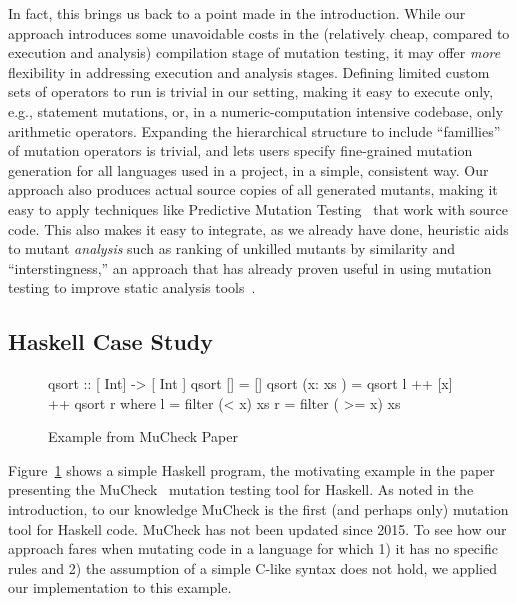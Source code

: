\documentclass[sigconf,review, anonymous]{acmart}
\begin{document}
{In fact, this brings us back to a point made in the introduction.
While our approach introduces some unavoidable costs in the
(relatively cheap, compared to execution and analysis) compilation stage of
mutation testing, it may offer \emph{more} flexibility in addressing
execution and analysis stages.  Defining limited custom sets of
operators to run is trivial in our setting, making it easy to
execute only, e.g., statement mutations, or, in a numeric-computation
intensive codebase, only arithmetic operators.  Expanding the
hierarchical structure to include ``famillies'' of mutation operators
is trivial, and lets users specify fine-grained mutation
generation for all languages used in a project, in a simple, consistent way.  Our approach also produces actual source
copies of all generated mutants, making it easy to apply techniques
like Predictive Mutation Testing~\cite{zhangPMT} that work with source
code.  This also makes it easy to integrate, as we already have done, heuristic
aids to mutant \emph{analysis} such as ranking of unkilled mutants by
similarity and ``interstingness,'' an approach that has already proven
useful in using mutation testing to improve static analysis tools~\cite{StatMut}.

\subsection{Haskell Case Study}

\begin{figure}

  \begin{code}
 qsort :: [ Int] -> [ Int ]
 qsort [] = []
 qsort (x: xs ) = qsort l ++ [x] ++ qsort r
     where l = filter (< x) xs
           r = filter ( >= x) xs
\end{code}
\caption{Example from MuCheck Paper}
\label{fig:haskell}

\end{figure}

Figure~\ref{fig:haskell} shows a simple Haskell program, the
motivating example in the paper presenting the MuCheck~\cite{mucheck}
mutation testing tool for Haskell.  As noted in the introduction, to our
knowledge MuCheck is the first (and perhaps only) mutation tool for
Haskell code.  MuCheck has not been updated since 2015.
To see how our approach fares when mutating code in a language for
which 1) it has no specific rules and 2) the assumption of a simple
C-like syntax does not hold, we applied our implementation to this example.

}
\end{document}
